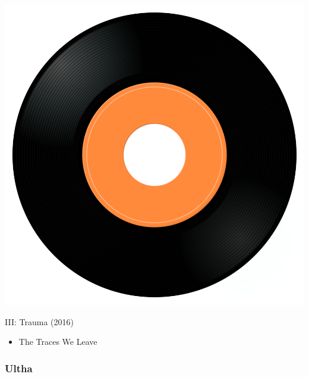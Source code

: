 \begin{minipage}[t]{0.25\textwidth}
\captionsetup{type=figure}
\includegraphics[width=\textwidth]{Images/cover.png}
\caption*{III: Trauma (2016)}
\end{minipage}
\begin{minipage}[t]{0.25\textwidth}\vspace{0pt}
\begin{itemize}[nosep,leftmargin=1em,labelwidth=*,align=left]
	\setlength{\itemsep}{0pt}
	\item The Traces We Leave
\end{itemize}
\end{minipage}

\subsubsection{Ultha}

